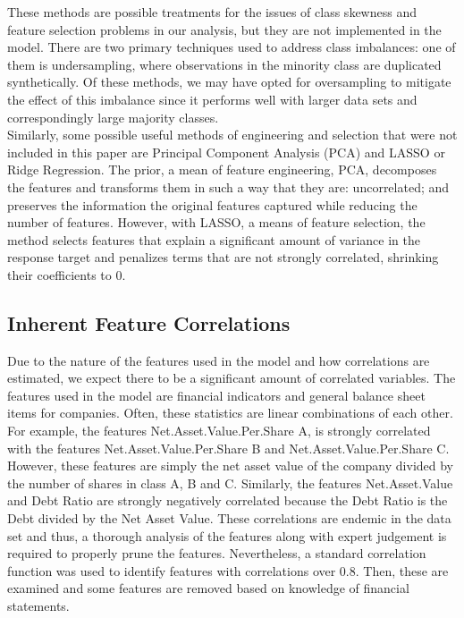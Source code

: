 \documentclass[12pt]{report}
\begin{document}
These methods are possible treatments for the issues of class skewness and feature selection problems in our analysis, but they are not implemented in the model. There are two primary techniques used to address class imbalances: one of them is undersampling, where observations in the minority class are duplicated synthetically. Of these methods, we may have opted for oversampling to mitigate the effect of this imbalance since it performs well with larger data sets and correspondingly large majority classes. \\
\indent Similarly, some possible useful methods of engineering and selection that were not included in this paper are Principal Component Analysis (PCA) and LASSO or Ridge Regression. The prior, a mean of feature engineering, PCA, decomposes the features and transforms them in such a way that they are: uncorrelated; and preserves the information the original features captured while reducing the number of features. However, with LASSO, a means of feature selection, the method selects features that explain a significant amount of variance in the response target and penalizes terms that are not strongly correlated, shrinking their coefficients to 0.  \\
\subsection{Inherent Feature Correlations}
\indent Due to the nature of the features used in the model and how correlations are estimated, we expect there to be a significant amount of correlated variables. The features used in the model are financial indicators and general balance sheet items for companies. Often, these statistics are linear combinations of each other. For example, the features Net.Asset.Value.Per.Share A, is strongly correlated with the features Net.Asset.Value.Per.Share B and Net.Asset.Value.Per.Share C. However, these features are simply the net asset value of the company divided by the number of shares in class A, B and C. Similarly, the features Net.Asset.Value and Debt Ratio are strongly negatively correlated because the Debt Ratio is the Debt divided by the Net Asset Value. These correlations are endemic in the data set and thus, a thorough analysis of the features along with expert judgement is required to properly prune the features. Nevertheless, a standard correlation function was used to identify features with correlations over 0.8. Then, these are examined and some features are removed based on knowledge of financial statements. \\ %
 \\%
\end{document}
